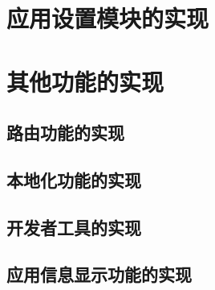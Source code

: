 \section{应用设置模块的实现}\label{sec:settings}



\section{其他功能的实现}\label{sec:other}

\subsection{路由功能的实现}\label{subsec:router}


\subsection{本地化功能的实现}\label{subsec:l10n}


\subsection{开发者工具的实现}\label{subsec:dev-tools}


\subsection{应用信息显示功能的实现}\label{subsec:about}

